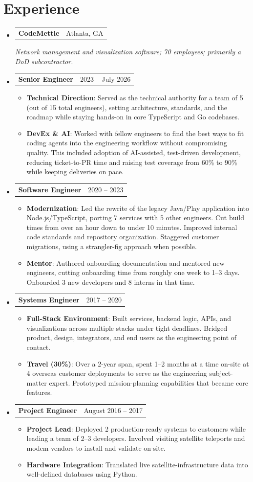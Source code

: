 \documentclass[letterpaper,11pt]{article}
\makeatletter
\newcommand{\mytexttilde}{\raisebox{0.5ex}{\texttildelow}}
\newcommand{\resumeSubHeadingListStart}{\begin{itemize}[leftmargin=0.08in, label={}]}
\newcommand{\resumeSubHeadingListEnd}{\end{itemize}}
\newcommand{\resumeItemListStart}{\begin{itemize}[leftmargin=.2in]}
\newcommand{\resumeItemListEnd}{\end{itemize}\vspace{-3pt}}
\newcommand{\resumeItem}[1]{
    \item\normalsize{
       {#1 \vspace{0pt}}
    }
}
\newcommand{\resumeHeading}[2]{
    \vspace{-3pt}\item
    \begin{tabular*}{0.97\textwidth}{l@{\extracolsep{\fill}}r}
      \textbf{#1} & #2
    \end{tabular*}\vspace{-3pt}
}
\newcommand{\resumeSubheading}[2]{
  \vspace{-5pt}\item
    \begin{tabular*}{0.97\textwidth}[t]{l@{\extracolsep{\fill}}r}
      \textbf{#1} & #2
    \end{tabular*}\vspace{-7pt}
}
\newcommand{\boldSubjectWithDesc}[2]{
  \normalsize{\textbf{#1}{: #2 \vspace{-2pt}}}
}
\makeatother
\begin{document}
\section{Experience}
\vspace{2pt}
\resumeSubHeadingListStart
\resumeHeading{\normalsize{CodeMettle}}{\normalsize{Atlanta, GA}}
\textit{\small Network management and visualization software; \mytexttilde70 employees; primarily a DoD subcontractor.}
\resumeSubheading{Senior Engineer}{2023 -- July 2026}
\resumeItemListStart
\resumeItem{
  \boldSubjectWithDesc{Technical Direction}{
    Served as the technical authority for a team of 5 (out of 15 total engineers), setting architecture, standards, and the roadmap while staying hands-on in core TypeScript and Go codebases.
  }
}
\resumeItem{
  \boldSubjectWithDesc{DevEx \& AI}{
    Worked with fellow engineers to find the best ways to fit coding agents into the engineering workflow without compromising quality.
    This included adoption of AI-assisted, test-driven development, reducing ticket-to-PR time and raising test coverage from 60\% to 90\% while keeping deliveries on pace. 
  }
}
\resumeItemListEnd
\resumeSubheading{Software Engineer}{2020 -- 2023}
\resumeItemListStart
\resumeItem{
  \boldSubjectWithDesc{Modernization}{
    Led the rewrite of the legacy Java/Play application into Node.js/TypeScript, porting 7 services with 5 other engineers.
    Cut build times from over an hour down to under 10 minutes.
    Improved internal code standards and repository organization.
    Staggered customer migrations, using a strangler-fig approach when possible.
  }
}
\resumeItem{
  \boldSubjectWithDesc{Mentor}{
    Authored onboarding documentation and mentored new engineers, cutting onboarding time from roughly one week to 1--3 days.
    Onboarded 3 new developers and 8 interns in that time.
  }
}
\resumeItemListEnd
\resumeSubheading{Systems Engineer}{2017 -- 2020}
\resumeItemListStart
\resumeItem{
  \boldSubjectWithDesc{Full-Stack Environment}{
    Built services, backend logic, APIs, and visualizations across multiple stacks under tight deadlines.
    Bridged product, design, integrators, and end users as the engineering point of contact.
  }
}
\resumeItem{
  \boldSubjectWithDesc{Travel (\mytexttilde30\%)}{
    Over a 2-year span, spent 1--2 months at a time on-site at 4 overseas customer deployments to serve as the engineering subject-matter expert.
    Prototyped mission-planning capabilities that became core features.
  }
}
\resumeItemListEnd
\resumeSubheading{Project Engineer}{August 2016 -- 2017}
\resumeItemListStart
\resumeItem{
  \boldSubjectWithDesc{Project Lead}{Deployed 2 production-ready systems to customers while leading a team of 2--3 developers.
    Involved visiting satellite teleports and modem vendors to install and validate on-site.
  }
}
\resumeItem{
  \boldSubjectWithDesc{Hardware Integration}{Translated live satellite-infrastructure data into well-defined databases using Python.}
}
\resumeItemListEnd
\resumeSubHeadingListEnd
\end{document}
